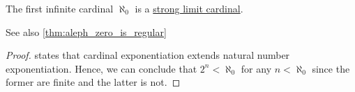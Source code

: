 \begin{definition}\label{def:strong_limit_cardinal}
\end{definition}

\begin{corollary}\label{thm:aleph_zero_is_strong_limit}
  The first infinite cardinal \( \aleph_0 \) is a \hyperref[def:strong_limit_cardinal]{strong limit cardinal}.
\end{corollary}
\begin{comments}
  \item See also \cref{thm:aleph_zero_is_regular}
\end{comments}
\begin{proof}
   states that cardinal exponentiation extends natural number exponentiation. Hence, we can conclude that \( 2^n < \aleph_0 \) for any \( n < \aleph_0 \) since the former are finite and the latter is not.
\end{proof}


